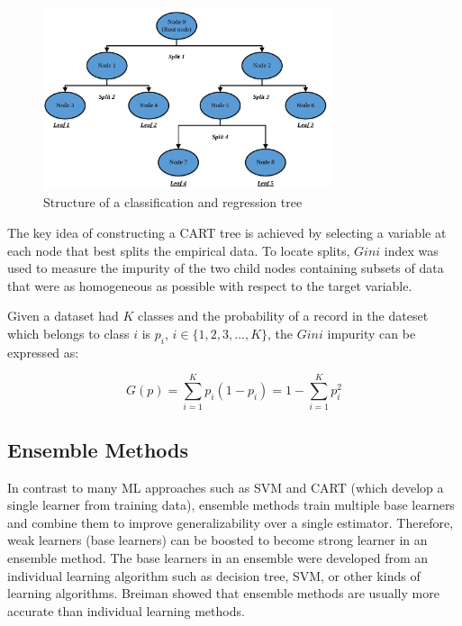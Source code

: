 \documentclass[11pt]{article}
\begin{document}
	
	\begin{figure}[!htb]
		\begin{center}
			\includegraphics[width=0.75\textwidth]{CART}
		\end{center}
		\caption{Structure of a classification and regression tree \cite{put2003classification}}
		\label{fig:CART}
	\end{figure}
	
	
The key idea of constructing a CART tree is achieved by selecting a variable at each node that best splits the empirical data. To locate splits, $Gini$ index was used to measure the impurity of the two child nodes containing subsets of data that were as homogeneous as possible with respect to the target variable.

	Given a dataset had $K$ classes and the probability of a record in the dateset which belongs to class $i$ is $p_i$, $i \in \{1,2,3,...,K\}$, the $Gini$ impurity can be expressed as:
	
	\begin{equation}
	G(p) = \sum_{i=1}^{K}p_i(1-p_i) = 1- \sum_{i=1}^{K}p_i^2
	\end{equation}
	
	
	\subsection{Ensemble Methods}
	In contrast to many ML approaches such as SVM and CART (which develop a single learner from training data), ensemble methods train multiple base learners and combine them \cite{chou2014machine} to improve generalizability over a single estimator. Therefore, weak learners (base learners) can be boosted to become strong learner \cite{frosyniotis2003divide} in an ensemble method. The base learners in an ensemble were developed from an individual learning algorithm such as decision tree, SVM, or other kinds of learning algorithms. Breiman \cite{dietterich2000ensemble} showed that ensemble methods are usually more accurate than individual learning methods.
	
\end{document}
